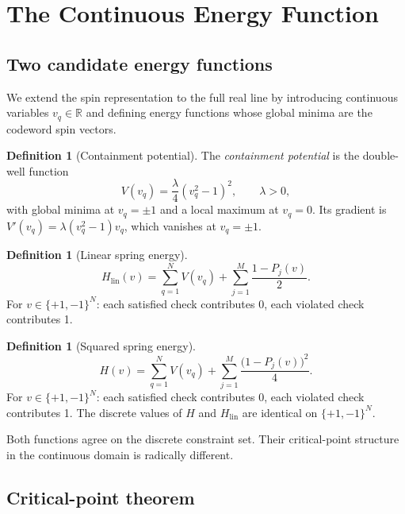 \documentclass[12pt,a4paper]{article}
\theoremstyle{plain}
\theoremstyle{definition}
\newtheorem{definition}[theorem]{Definition}
\theoremstyle{remark}
\newcommand{\R}{\mathbb{R}}
\begin{document}
\section{The Continuous Energy Function}\label{sec:energy}

\subsection{Two candidate energy functions}

We extend the spin representation to the full real line by introducing
continuous variables $v_q \in \R$ and defining energy functions whose
global minima are the codeword spin vectors.

\begin{definition}[Containment potential]\label{def:containment}
The \emph{containment potential} is the double-well function
\[
  V(v_q) = \frac{\lambda}{4}(v_q^2 - 1)^2, \qquad \lambda > 0,
\]
with global minima at $v_q = \pm 1$ and a local maximum at $v_q = 0$.
Its gradient is $V'(v_q) = \lambda(v_q^2-1)v_q$, which vanishes at
$v_q = \pm 1$.
\end{definition}

\begin{definition}[Linear spring energy]\label{def:linear_spring}
\[
  H_{\mathrm{lin}}(v) = \sum_{q=1}^N V(v_q) + \sum_{j=1}^M \frac{1-P_j(v)}{2}.
\]
For $v \in \{+1,-1\}^N$: each satisfied check contributes 0, each
violated check contributes 1.
\end{definition}

\begin{definition}[Squared spring energy]\label{def:sq_spring}
\[
  H(v) = \sum_{q=1}^N V(v_q) + \sum_{j=1}^M \frac{\bigl(1-P_j(v)\bigr)^2}{4}.
\]
For $v \in \{+1,-1\}^N$: each satisfied check contributes 0, each
violated check contributes 1. The discrete values of $H$ and
$H_{\mathrm{lin}}$ are identical on $\{+1,-1\}^N$.
\end{definition}

Both functions agree on the discrete constraint set.
Their critical-point structure in the continuous domain is radically different.

\subsection{Critical-point theorem}
\end{document}

